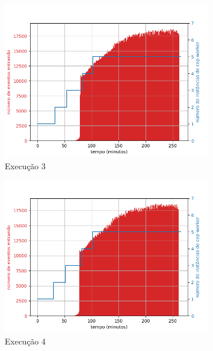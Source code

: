 \begin{figure}[h!]
\begin{subfigure}{.5\textwidth}
  \centering
  \includegraphics[width=\linewidth]{figuras/graphics/carga_e_workers_total8-dez-su.png}  
  \caption{Execução 3}
  \label{fig:cewt-8-dez-su}
\end{subfigure}
\begin{subfigure}{.5\textwidth}
  \centering
  \includegraphics[width=\linewidth]{figuras/graphics/carga_e_workers_total9-dez-su.png}  
  \caption{Execução 4}
  \label{fig:cewt-9-dez-su}
\end{subfigure}
\begin{subfigure}{.5\textwidth}
  \centering

\end{subfigure}
\end{figure}
